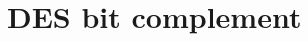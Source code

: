 \section{DES bit complement}

\begin{comment}
DES has an incredible property concerning the bitwise complement of the input and output bits. The
complement (meaning all Bits are inverted) of a bit stream A is given with A0(example: If A = 0110
the complement is A0 = 1001.) “bXOR“ is the bitwise XOR. We want to show that: If
y = DES_k(x)
than also is:
y_0 = DES_k0 (x0):
Meaning if we sent the complement of the message and the key than the complement of the original
cipher text is returned. Your exercise is to proof this property. (Hint: Try to proof the property for any
round instead of calculating all 16 rounds!)
\end{comment}
